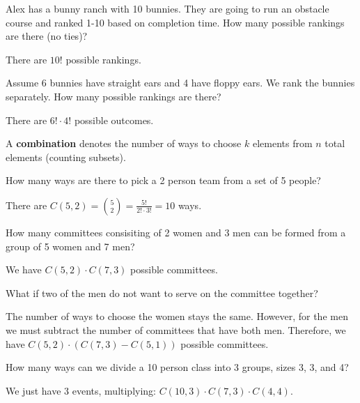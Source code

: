 \begin{eg}
	Alex has a bunny ranch with 10 bunnies. They are going to run an obstacle course and ranked 1-10 based on completion time. How many possible rankings are there (no ties)?
\end{eg}
\begin{explanation}
	There are \( 10! \) possible rankings.
\end{explanation}

\begin{eg}
	Assume 6 bunnies have straight ears and 4 have floppy ears. We rank the bunnies separately. How many possible rankings are there?
\end{eg}
\begin{explanation}
	There are \( 6! \cdot 4! \) possible outcomes.
\end{explanation}

\begin{definition}
	A \textbf{combination} denotes the number of ways to choose \( k \) elements from \( n \) total elements (counting subsets).
\end{definition}

\begin{eg}
	How many ways are there to pick a 2 person team from a set of 5 people?
\end{eg}
\begin{explanation}
	There are \( C(5,2) = \binom{5}{2} = \frac{5!}{2!\cdot 3!} = 10 \) ways.
\end{explanation}

\begin{eg}
	How many committees consisiting of 2 women and 3 men can be formed from a group of 5 women and 7 men?
\end{eg}
\begin{explanation}
	We have \( C(5,2) \cdot C(7,3) \) possible committees.
\end{explanation}

\begin{eg}
	What if two of the men do not want to serve on the committee together?
\end{eg}
\begin{explanation}
	The number of ways to choose the women stays the same. However, for the men we must subtract the number of committees that have both men. Therefore, we have \( C(5,2) \cdot (C(7,3) - C(5,1)) \) possible committees.
\end{explanation}

\begin{eg}
	How many ways can we divide a 10 person class into 3 groups, sizes 3, 3, and 4?
\end{eg}
\begin{explanation}
	We just have 3 events, multiplying: \( C(10,3)\cdot C(7,3)\cdot C(4,4) \).
\end{explanation}

